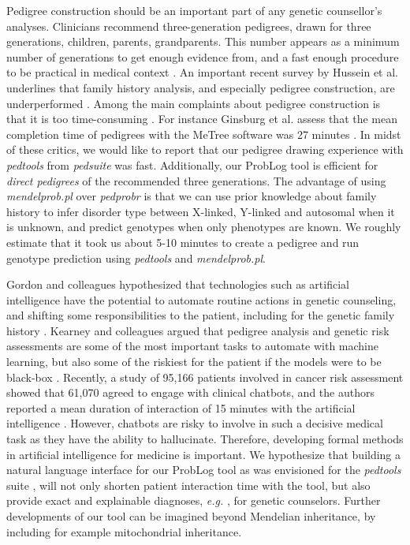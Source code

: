 \documentclass{eptcs}
\begin{document}
Pedigree construction \cite{gordon_future_2018} should be an important part of any genetic counsellor's \linebreak[4] analyses. Clinicians recommend three-generation pedigrees, drawn for three generations, children, \linebreak[4] parents, grandparents. This number appears as a minimum number of generations to get enough evidence from, and a fast enough procedure to be practical in medical context \cite{wattendorf_family_2005}. \linebreak[4] An important recent survey by Hussein et al. underlines that family history analysis, and especially pedigree construction, are underperformed \cite{hussein_is_2020}. Among the main complaints about pedigree construction is that it is too time-consuming \cite{hussein_is_2020, ginsburg_family_2019}. For instance Ginsburg et al. assess that the mean completion time of pedigrees with the MeTree software was 27 minutes \cite{ginsburg_family_2019}. In midst of these critics, we would like to report that our pedigree drawing experience with \textit{pedtools} from \textit{pedsuite} \cite{vigeland_pedigree_2021} was fast. Additionally, our ProbLog tool is efficient for \textit{direct pedigrees} of the recommended three generations. The advantage of using \textit{mendelprob.pl} over \textit{pedprobr} is that we can use prior knowledge about family history to infer disorder type between X-linked, Y-linked and autosomal when it is unknown, and predict genotypes when only phenotypes are known. We roughly estimate that it took us about 5-10 minutes to create a pedigree and run genotype prediction using \textit{pedtools} and \textit{mendelprob.pl}.

Gordon and colleagues hypothesized that technologies such as artificial intelligence have the \linebreak[4] potential to automate routine actions in genetic counseling, and shifting some responsibilities to the patient, including for the genetic family history \cite{gordon_future_2018}. Kearney and colleagues argued that pedigree analysis and genetic risk assessments are some of the most important tasks to automate with machine learning, but also some of the riskiest for the patient if the models were to be black-box \cite{kearney_artificial_2020}. Recently, a study of 95,166 patients involved in cancer risk assessment showed that 61,070 agreed to engage with clinical chatbots, and the authors reported a mean duration of interaction of 15 minutes with the artificial intelligence \cite{nazareth_hereditary_2021}. However, chatbots are risky to involve in such a decisive medical task as they have the ability to hallucinate. Therefore, developing formal methods in artificial intelligence for medicine is important. We hypothesize that building a natural language interface for our ProbLog tool as was envisioned for the \textit{pedtools} suite \cite{vigeland_quickped_2022}, will not only shorten patient interaction time with the tool, but also provide exact and explainable diagnoses, \textit{e.g.} \cite{vidal_explaining_2025, arias_justifications_2020}, for genetic counselors.  Further developments of our tool can be imagined beyond Mendelian inheritance, by including for example mitochondrial inheritance.
\end{document}
